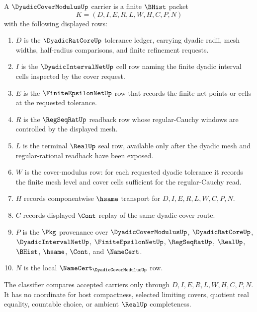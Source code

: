 \begin{definition}
\label{def:dyadic-cover-modulus-carrier}
A $\DyadicCoverModulusUp$ carrier is a finite $\BHist$ packet
$$
K=(D,I,E,R,L,W,H,C,P,N)
$$
with the following displayed rows:
\begin{enumerate}
\item $D$ is the $\DyadicRatCoreUp$ tolerance ledger, carrying dyadic radii, mesh widths, half-radius comparisons, and finite refinement requests.
\item $I$ is the $\DyadicIntervalNetUp$ cell row naming the finite dyadic interval cells inspected by the cover request.
\item $E$ is the $\FiniteEpsilonNetUp$ row that records the finite net points or cells at the requested tolerance.
\item $R$ is the $\RegSeqRatUp$ readback row whose regular-Cauchy windows are controlled by the displayed mesh.
\item $L$ is the terminal $\RealUp$ seal row, available only after the dyadic mesh and regular-rational readback have been exposed.
\item $W$ is the cover-modulus row: for each requested dyadic tolerance it records the finite mesh level and cover cells sufficient for the regular-Cauchy read.
\item $H$ records componentwise $\hsame$ transport for $D,I,E,R,L,W,C,P,N$.
\item $C$ records displayed $\Cont$ replay of the same dyadic-cover route.
\item $P$ is the $\Pkg$ provenance over $\DyadicCoverModulusUp$, $\DyadicRatCoreUp$, $\DyadicIntervalNetUp$, $\FiniteEpsilonNetUp$, $\RegSeqRatUp$, $\RealUp$, $\BHist$, $\hsame$, $\Cont$, and $\NameCert$.
\item $N$ is the local $\NameCert_{\DyadicCoverModulusUp}$ row.
\end{enumerate}
The classifier compares accepted carriers only through $D,I,E,R,L,W,H,C,P,N$. It has no coordinate for host compactness, selected limiting covers, quotient real equality, countable choice, or ambient $\RealUp$ completeness.
\end{definition}

